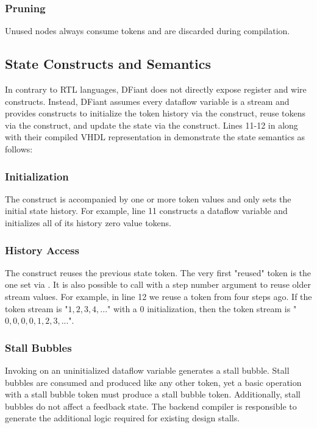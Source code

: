 \subsubsection{Pruning}
Unused nodes always consume tokens and are discarded during compilation. 


\subsection{State Constructs and Semantics}
\label{sec:state_constructs}
In contrary to RTL languages, DFiant does not directly expose register and wire constructs. Instead, DFiant assumes every dataflow variable is a stream and provides constructs to initialize the token history via the  construct, reuse tokens via the  construct, and update the state via the \code{:=} construct. Lines 11-12 in  along with their compiled VHDL representation in  demonstrate the state semantics as follows:

\subsubsection{Initialization} The  construct is accompanied by one or more token values and only sets the initial state history. For example, line 11 constructs a dataflow variable and initializes all of its history zero value tokens. 

\subsubsection{History Access} The  construct reuses the previous state token. The very first "reused" token is the one set via . It is also possible to call  with a step number argument to reuse older stream values. For example, in line 12 we reuse a  token from four steps ago. If the  token stream is "$1,2,3,4,...$" with a $0$ initialization, then the  token stream is "$0,0,0,0,1,2,3,...$".

\subsubsection{Stall Bubbles} Invoking  on an uninitialized dataflow variable generates a stall bubble. Stall bubbles are consumed and produced like any other token, yet a basic operation with a stall bubble token must produce a stall bubble token. Additionally, stall bubbles do not affect a feedback state. The backend compiler is responsible to generate the additional logic required for existing design stalls. 

